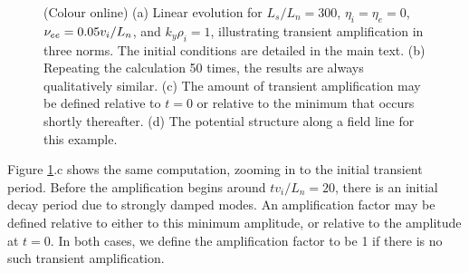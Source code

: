 \documentclass{jpp}
\begin{document}
\begin{figure}
{}
\caption{(Colour online) (a) Linear evolution for $L_s/L_n=300$, $\eta_i = \eta_e = 0$,
$\nu_{ee} = 0.05 v_i/L_n$, and $k_y \rho_i = 1$, illustrating transient amplification in three norms.
The initial conditions are detailed in the main text.
(b) Repeating the calculation 50 times, the results are always qualitatively similar.
(c) The amount of transient amplification may be defined relative to $t=0$ or relative
to the minimum that occurs shortly thereafter.
(d) The potential structure along a field line for this example.
\label{fig:transientAmplification}}
\end{figure}

Figure \ref{fig:transientAmplification}.c shows the same computation, zooming in to the initial transient period.
Before the amplification begins around $t v_i/L_n=20$, there is an initial decay period due to strongly
damped modes. An amplification factor may be defined relative to either to this minimum amplitude,
or relative to the amplitude at $t=0$.
In both cases, we define the amplification factor to be 1
if there is no such transient amplification.
\end{document}
